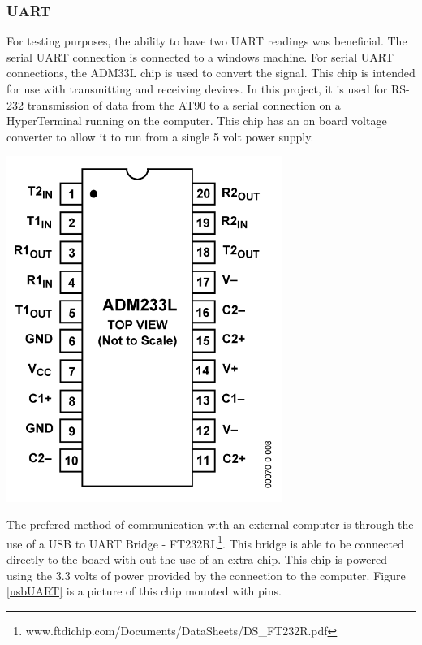 \subsubsection{UART}
For testing purposes, the ability to have two UART readings was beneficial. The serial UART connection is connected to a windows machine. For serial UART connections, the ADM33L chip is used to convert the signal. This chip is intended for use with transmitting and receiving devices. In this project, it is used for RS-232 transmission of data from the AT90 to a serial connection on a HyperTerminal running on the computer. This chip has an on board voltage converter to allow it to run from a single 5 volt power supply. 
\begin{minipage}{6.5in}
  \centering
    \includegraphics[width=90mm]{imageSources/serialUART.png}
  
  \label{serialUART}
\end{minipage}

The prefered method of communication with an external computer is through the use of a USB to UART Bridge - FT232RL\footnote{www.ftdichip.com/Documents/DataSheets/DS\_FT232R.pdf }. This bridge is able to be connected directly to the board with out the use of an extra chip. This chip is powered using the 3.3 volts of power provided by the connection to the computer. Figure \ref{usbUART} is a picture of this chip mounted with pins. 

